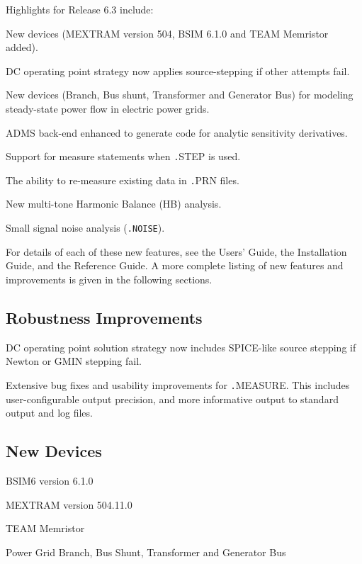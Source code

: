 \documentclass[11pt,report,strict]{SANDreport}
\begin{document}
Highlights for \Xyce{} Release 6.3 include:
\begin{XyceItemize}
\item New devices (MEXTRAM version 504, BSIM 6.1.0 and TEAM Memristor added).
\item DC operating point strategy now applies source-stepping if other attempts fail.
\item New devices (Branch, Bus shunt, Transformer and Generator Bus) 
  for modeling steady-state power flow in electric power grids.
\item ADMS back-end enhanced to generate code for analytic sensitivity derivatives. 
\item Support for measure statements when {\texttt .STEP} is used.
\item The ability to re-measure existing data in {\texttt .PRN} files.
\item New multi-tone Harmonic Balance (HB) analysis.
\item Small signal noise analysis (\texttt{.NOISE}).
  
\end{XyceItemize}
For details of each of these new features, see the \Xyce{} Users' Guide, the
\Xyce{} Installation Guide, and the \Xyce{} Reference Guide.  A more complete
listing of new features and improvements is given in the following sections.

\subsection{Robustness Improvements}
\begin{XyceItemize}
\item DC operating point solution strategy now includes SPICE-like source stepping if Newton or GMIN stepping fail.
\item Extensive bug fixes and usability improvements for {\texttt .MEASURE}.  This includes
user-configurable output precision, and more informative output to standard output 
and log files.
\end{XyceItemize}

\subsection{New Devices}
\begin{XyceItemize}
\item BSIM6 version 6.1.0
\item MEXTRAM version 504.11.0
\item TEAM Memristor
\item Power Grid Branch, Bus Shunt, Transformer and Generator Bus
\end{XyceItemize}
\end{document}

